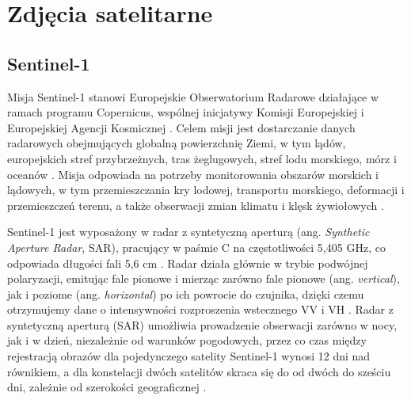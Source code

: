 \documentclass{amuthesis}
\begin{document}
\hypertarget{sec-satellite-imagery}{%
\section{Zdjęcia satelitarne}\label{sec-satellite-imagery}}

\hypertarget{sec-sentinel1}{%
\subsection{Sentinel-1}\label{sec-sentinel1}}

Misja Sentinel-1 stanowi Europejskie Obserwatorium Radarowe działające w
ramach programu Copernicus, wspólnej inicjatywy Komisji Europejskiej i
Europejskiej Agencji Kosmicznej \autocite{sentinel1_overview}. Celem
misji jest dostarczanie danych radarowych obejmujących globalną
powierzchnię Ziemi, w tym lądów, europejskich stref przybrzeżnych, tras
żeglugowych, stref lodu morskiego, mórz i oceanów
\autocite{hejmanowska_2020_dane,sentinel1_mission_objectives}. Misja
odpowiada na potrzeby monitorowania obszarów morskich i lądowych, w tym
przemieszczania kry lodowej, transportu morskiego, deformacji i
przemieszczeń terenu, a także obserwacji zmian klimatu i klęsk
żywiołowych
\autocite{hejmanowska_2020_dane,sentinel1_mission_objectives}.

Sentinel-1 jest wyposażony w radar z syntetyczną aperturą (ang.
\emph{Synthetic Aperture Radar}, SAR), pracujący w paśmie C na
częstotliwości 5,405 GHz, co odpowiada długości fali 5,6 cm
\autocite{sentinel1_lulc,sentinel1_instrument_payload}. Radar działa
głównie w trybie podwójnej polaryzacji, emitując fale pionowe i mierząc
zarówno fale pionowe (ang. \emph{vertical}), jak i poziome (ang.
\emph{horizontal}) po ich powrocie do czujnika, dzięki czemu otrzymujemy
dane o intensywności rozproszenia wstecznego VV i VH
\autocite{sentinel1_lulc}. Radar z syntetyczną aperturą (SAR) umożliwia
prowadzenie obserwacji zarówno w nocy, jak i w dzień, niezależnie od
warunków pogodowych, przez co czas między rejestracją obrazów dla
pojedynczego satelity Sentinel-1 wynosi 12 dni nad równikiem, a dla
konstelacji dwóch satelitów skraca się do od dwóch do sześciu dni,
zależnie od szerokości geograficznej
\autocite{hejmanowska_2020_dane,sentinel1_overview}.
\end{document}
